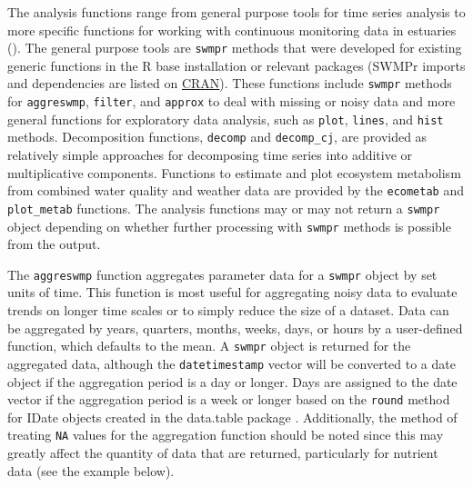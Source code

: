 \documentclass[10pt,letterpaper]{article}\usepackage[]{graphicx}\usepackage[]{color}
\begin{document}
The analysis functions range from general purpose tools for time series analysis to more specific functions for working with continuous monitoring data in estuaries ().  The general purpose tools are \texttt{swmpr} methods that were developed for existing generic functions in the R base installation or relevant packages (SWMPr imports and dependencies are listed on \href{http://cran.r-project.org/web/packages/SWMPr/index.html}{CRAN}). These functions include \texttt{swmpr} methods for \texttt{aggreswmp}, \texttt{filter}, and \texttt{approx} to deal with missing or noisy data and more general functions for exploratory data analysis, such as \texttt{plot}, \texttt{lines}, and \texttt{hist} methods.  Decomposition functions, \texttt{decomp} and \texttt{decomp\_cj}, are provided as relatively simple approaches for decomposing time series into additive or multiplicative components. Functions to estimate and plot ecosystem metabolism from combined water quality and weather data are provided by the \texttt{ecometab} and \texttt{plot\_metab} functions.  The analysis functions may or may not return a \texttt{swmpr} object depending on whether further processing with \texttt{swmpr} methods is possible from the output.    

The \texttt{aggreswmp} function aggregates parameter data for a \texttt{swmpr} object by set units of time.  This function is most useful for aggregating noisy data to evaluate trends on longer time scales or to simply reduce the size of a dataset.  Data can be aggregated by years, quarters, months, weeks, days, or hours by a user-defined function, which defaults to the mean.  A \texttt{swmpr} object is returned for the aggregated data, although the \texttt{datetimestamp} vector will be converted to a date object if the aggregation period is a day or longer.  Days are assigned to the date vector if the aggregation period is a week or longer based on the \texttt{round} method for IDate objects created in the data.table package \cite{Dowle14}.  Additionally, the method of treating \texttt{NA} values for the aggregation function should be noted since this may greatly affect the quantity of data that are returned, particularly for nutrient data (see the example below).
\end{document}
